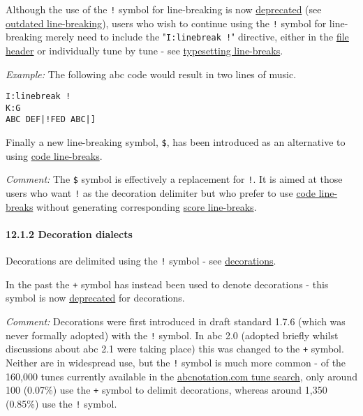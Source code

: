 Although the use of the \texttt{!} symbol for line-breaking is now
\protect\hyperlink{outdated_syntax}{deprecated} (see
\protect\hyperlink{outdated_line-breaking}{outdated line-breaking}),
users who wish to continue using the \texttt{!} symbol for line-breaking
merely need to include the "\texttt{I:linebreak\ !}" directive, either
in the \protect\hyperlink{file_header_definition}{file header} or
individually tune by tune - see
\protect\hyperlink{typesetting_line-breaks}{typesetting line-breaks}.

\emph{Example:} The following abc code would result in two lines of
music.

\begin{verbatim}
I:linebreak !
K:G
ABC DEF|!FED ABC|]
\end{verbatim}

Finally a new line-breaking symbol, \texttt{\$}, has been introduced as
an alternative to using
\protect\hyperlink{code_line-break_definition}{code line-breaks}.

\emph{Comment:} The \texttt{\$} symbol is effectively a replacement for
\texttt{!}. It is aimed at those users who want \texttt{!} as the
decoration delimiter but who prefer to use
\protect\hyperlink{code_line-break_definition}{code line-breaks} without
generating corresponding
\protect\hyperlink{score_line-break_definition}{score line-breaks}.

\hypertarget{decoration_dialects}{\paragraph{12.1.2 Decoration
dialects}\label{decoration_dialects}}

Decorations are delimited using the \texttt{!} symbol - see
\protect\hyperlink{decorations}{decorations}.

In the past the \texttt{+} symbol has instead been used to denote
decorations - this symbol is now
\protect\hyperlink{outdated_syntax}{deprecated} for decorations.

\emph{Comment:} Decorations were first introduced in draft standard
1.7.6 (which was never formally adopted) with the \texttt{!} symbol. In
abc 2.0 (adopted briefly whilst discussions about abc 2.1 were taking
place) this was changed to the \texttt{+} symbol. Neither are in
widespread use, but the \texttt{!} symbol is much more common - of the
160,000 tunes currently available in the
\href{http://abcnotation.com/search}{abcnotation.com tune search}, only
around 100 (0.07\%) use the \texttt{+} symbol to delimit decorations,
whereas around 1,350 (0.85\%) use the \texttt{!} symbol.

